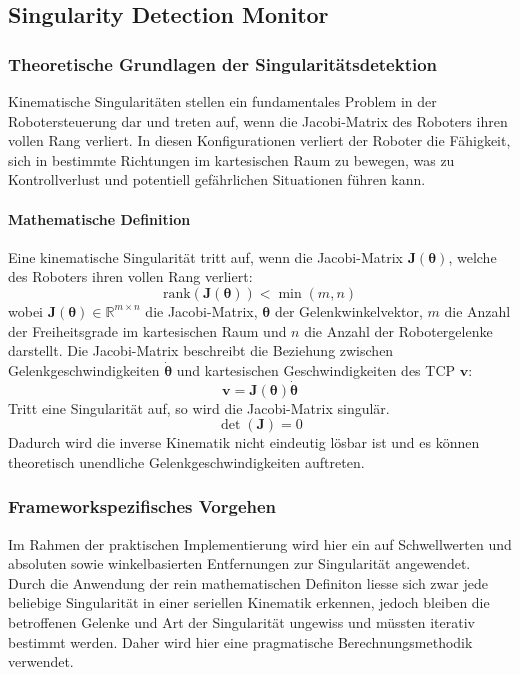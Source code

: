 \subsection{Singularity Detection Monitor} \label{ssec:Singularitaeten}

\subsubsection{Theoretische Grundlagen der Singularitätsdetektion}
\label{sssec:Theorie_Singularitaeten}
Kinematische Singularitäten stellen ein fundamentales Problem in der
Robotersteuerung dar und treten auf, wenn die Jacobi-Matrix des Roboters ihren
vollen Rang verliert. In diesen Konfigurationen verliert der Roboter die
Fähigkeit, sich in bestimmte Richtungen im kartesischen Raum zu bewegen, was zu
Kontrollverlust und potentiell gefährlichen Situationen führen
kann.

\paragraph{Mathematische Definition} Eine kinematische Singularität tritt auf,
wenn die Jacobi-Matrix $\mathbf{J}(\boldsymbol{\theta})$, welche des Roboters
ihren vollen Rang verliert: \begin{equation}
	\text{rank}(\mathbf{J}(\boldsymbol{\theta})) < \min(m, n)
	\label{eq:singularity_condition} \end{equation} wobei
$\mathbf{J}(\boldsymbol{\theta}) \in \mathbb{R}^{m \times n}$ die Jacobi-Matrix,
$\boldsymbol{\theta}$ der Gelenkwinkelvektor, $m$ die Anzahl der Freiheitsgrade
im kartesischen Raum und $n$ die Anzahl der Robotergelenke darstellt.
\noindent
Die Jacobi-Matrix beschreibt die Beziehung zwischen Gelenkgeschwindigkeiten
$\dot{\boldsymbol{\theta}}$ und kartesischen Geschwindigkeiten des TCP
$\mathbf{v}$: \begin{equation} \mathbf{v} = \mathbf{J}(\boldsymbol{\theta})
	\dot{\boldsymbol{\theta}} \label{eq:jacobian_velocity}
\end{equation}
\noindent
Tritt eine Singularität auf, so wird die Jacobi-Matrix singulär.
\begin{equation} \det(\mathbf{J}) = 0 \label{eq:jacobian_singularity}
\end{equation} Dadurch wird die inverse Kinematik nicht
eindeutig lösbar ist und es können theoretisch unendliche
Gelenkgeschwindigkeiten auftreten.

\subsubsection{Frameworkspezifisches Vorgehen} Im
Rahmen der praktischen Implementierung wird hier ein auf Schwellwerten und
absoluten sowie winkelbasierten Entfernungen zur Singularität angewendet. Durch
die Anwendung der rein mathematischen Definiton liesse sich zwar jede beliebige
Singularität in einer seriellen Kinematik erkennen, jedoch bleiben die
betroffenen Gelenke und Art der Singularität ungewiss und müssten iterativ
bestimmt werden. Daher wird hier eine pragmatische Berechnungsmethodik
verwendet.\\

